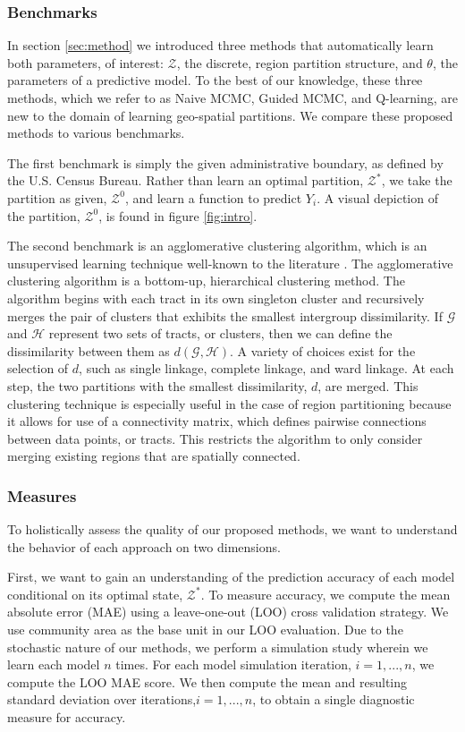 \subsubsection{Benchmarks}\label{benchmarks}
In section \ref{sec:method} we introduced three methods that automatically learn both parameters, of interest: $\mathcal{Z}$, the discrete, region partition structure, and $\theta$, the parameters of a predictive model. To the best of our knowledge, these three methods, which we refer to as Naive MCMC, Guided MCMC, and Q-learning, are new to the domain of learning geo-spatial partitions. We compare these proposed methods to various benchmarks.  

The first benchmark is simply the given administrative boundary, as defined by the U.S. Census Bureau. Rather than learn an optimal partition, $\mathcal{Z}^*$, we take the partition as given, $\mathcal{Z}^0$, and learn a function to predict $Y_i$. A visual depiction of the partition, $\mathcal{Z}^0$, is found in figure \ref{fig:intro}.


The second benchmark is an agglomerative clustering algorithm, which is an unsupervised learning technique well-known to the literature \cite{hastie:book}. The agglomerative clustering algorithm is a bottom-up, hierarchical clustering method.  The algorithm begins with each tract in its own singleton cluster and recursively merges the pair of clusters that exhibits the smallest intergroup dissimilarity. If $\mathcal{G}$ and $\mathcal{H}$ represent two sets of tracts, or clusters, then we can define the dissimilarity between them as $d(\mathcal{G},\mathcal{H})$. A variety of choices exist for the selection of $d$, such as single linkage, complete linkage, and ward linkage. At each step, the two partitions with the smallest dissimilarity, $d$, are merged. This clustering technique is especially useful in the case of region partitioning because it allows for use of a connectivity matrix, which defines pairwise connections between data points, or tracts. This restricts the algorithm to only consider merging existing regions that are spatially connected.
\subsubsection{Measures} To holistically assess the quality of our proposed methods, we want to understand the behavior of each approach on two dimensions. 

First, we want to gain an understanding of the prediction accuracy of each model conditional on its optimal state, $\mathcal{Z}^*$. To measure accuracy, we compute the mean absolute error (MAE) using a leave-one-out (LOO) cross validation strategy. We use community area as the base unit in our LOO evaluation. Due to the stochastic nature of our methods, we perform a simulation study wherein we learn each model $n$ times.
For each model simulation iteration, $i = 1,...,n$, we compute the LOO MAE score. We then compute the mean and resulting standard deviation over iterations,$i = 1,...,n$, to obtain a single diagnostic measure for accuracy.

